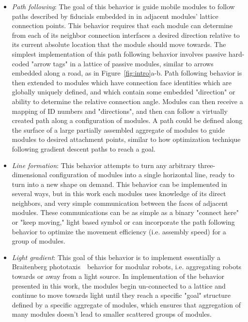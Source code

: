 \begin{itemize}
	\item \textit{Path following}: The goal of this behavior is guide mobile modules to follow paths described by fiducials embedded in in adjacent modules' lattice connection points. This behavior requires that  each module can determine from each of its neighbor connection interfaces a desired direction relative to its current absolute location that the module should move towards. The simplest implementation of this path following behavior involves passive hard-coded "arrow tags" in a lattice of passive modules, similar to arrows embedded along a road, as in Figure~\ref{fig:intro}a-b. Path following behavior is then extended to modules which have connection face identities which are globally uniquely defined, and which contain some embedded "direction" or ability to determine the relative connection angle. Modules can then receive a mapping of ID numbers and "directions", and then can follow a virtually created path along a configuration of modules. A path could be defined along the surface of a large partially assembled aggregate of modules to guide modules to desired attachment points, similar to how optimization technique following gradient descent paths to reach a goal.
	\item \textit{Line formation}: This behavior attempts to turn any arbitrary three-dimensional configuration of modules into a single horizontal line, ready to turn into a new shape on demand. This behavior can be implemented in several ways, but in this work each modules uses knowledge of its direct neighbors, and very simple communication between the faces of adjacent modules. These communications can be as simple as a binary "connect here" or "keep moving," light based symbol or can incorporate the path following behavior to optimize the movement efficiency (i.e. assembly speed) for a group of modules.
	\item \textit{Light gradient}: This goal of this behavior is to implement essentially a Braitenberg phototaxis~\ behavior for modular robots, i.e. aggregating robots towards or away from a light source. In implementation of the behavior presented in this work, the modules begin un-connected to a lattice and continue to move towards light until they reach a specific "goal" structure defined by a specific aggregate of modules, which ensures that aggregation of many modules doesn't lead to smaller scattered groups of modules.
\end{itemize}

